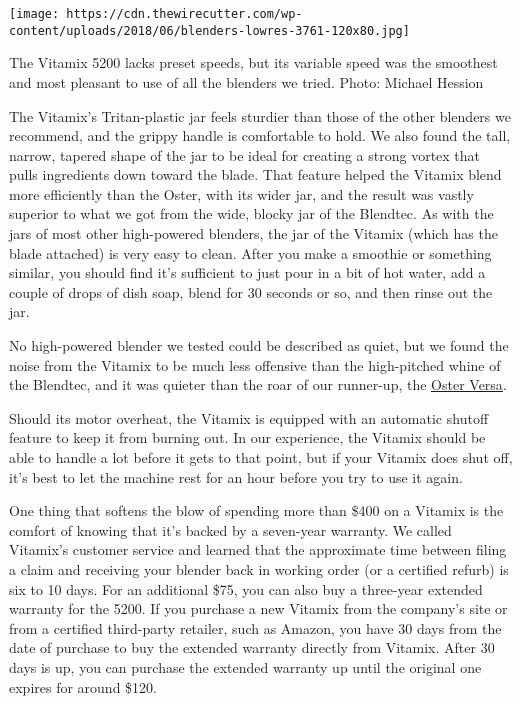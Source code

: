 \texttt{[image: https://cdn.thewirecutter.com/wp-content/uploads/2018/06/blenders-lowres-3761-120x80.jpg]}

The Vitamix 5200 lacks preset speeds, but its variable speed was the
smoothest and most pleasant to use of all the blenders we tried. Photo:
Michael Hession

The Vitamix's Tritan-plastic jar feels sturdier than those of the other
blenders we recommend, and the grippy handle is comfortable to hold. We
also found the tall, narrow, tapered shape of the jar to be ideal for
creating a strong vortex that pulls ingredients down toward the blade.
That feature helped the Vitamix blend more efficiently than the Oster,
with its wider jar, and the result was vastly superior to what we got
from the wide, blocky jar of the Blendtec. As with the jars of most
other high-powered blenders, the jar of the Vitamix (which has the blade
attached) is very easy to clean. After you make a smoothie or something
similar, you should find it's sufficient to just pour in a bit of hot
water, add a couple of drops of dish soap, blend for 30 seconds or so,
and then rinse out the jar.

No high-powered blender we tested could be described as quiet, but we
found the noise from the Vitamix to be much less offensive than the
high-pitched whine of the Blendtec, and it was quieter than the roar of
our runner-up, the
\protect\hyperlink{runner-up-oster-versa-pro-series-blender}{Oster
Versa}.

Should its motor overheat, the Vitamix is equipped with an automatic
shutoff feature to keep it from burning out. In our experience, the
Vitamix should be able to handle a lot before it gets to that point, but
if your Vitamix does shut off, it's best to let the machine rest for an
hour before you try to use it again.

One thing that softens the blow of spending more than \$400 on a Vitamix
is the comfort of knowing that it's backed by a seven-year warranty. We
called Vitamix's customer service and learned that the approximate time
between filing a claim and receiving your blender back in working order
(or a certified refurb) is six to 10 days. For an additional \$75, you
can also buy a three-year extended warranty for the 5200. If you
purchase a new Vitamix from the company's site or from a certified
third-party retailer, such as Amazon, you have 30 days from the date of
purchase to buy the extended warranty directly from Vitamix. After 30
days is up, you can purchase the extended warranty up until the original
one expires for around \$120.

